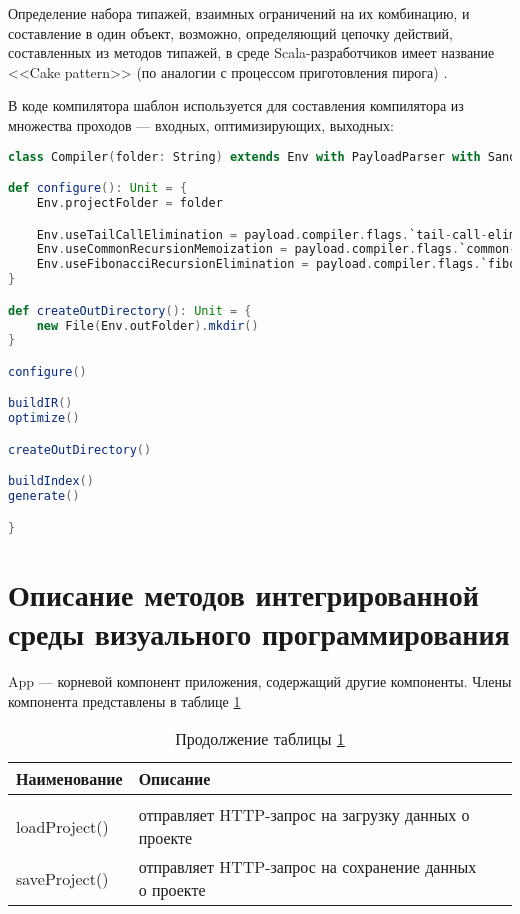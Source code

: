 Определение набора типажей, взаимных ограничений на их комбинацию,
и составление в один объект, возможно, определяющий цепочку действий,
составленных из методов типажей, в среде Scala-разработчиков имеет название
<<Cake pattern>> (по аналогии с процессом приготовления пирога) \cite{cakepattern}.

В коде компилятора шаблон используется для составления компилятора из
множества проходов --- входных, оптимизирующих, выходных:

\begin{lstlisting}[language=Scala]
class Compiler(folder: String) extends Env with PayloadParser with Sandbox with IRBuilder with Optimizer with CodeGenerator with IndexBuilder {

def configure(): Unit = {
    Env.projectFolder = folder

    Env.useTailCallElimination = payload.compiler.flags.`tail-call-elimination`
    Env.useCommonRecursionMemoization = payload.compiler.flags.`common-recursion-memoization`
    Env.useFibonacciRecursionElimination = payload.compiler.flags.`fibonacci-elimination`
}

def createOutDirectory(): Unit = {
    new File(Env.outFolder).mkdir()
}

configure()

buildIR()
optimize()

createOutDirectory()

buildIndex()
generate()

}
\end{lstlisting}

\section{Описание методов интегрированной среды визуального программирования}\label{sec:ch3/sect3}

App --- корневой компонент приложения, содержащий другие компоненты. Члены компонента представлены в таблице \ref{tab:class1}

\begin{longtable} {| p{8.3cm} | p{8.35cm}l |}
	\caption{Члены компонента App}
	\label{tab:class1}\\
	\hline
	\centering Наименование &  \centering Описание & \\
	\hline
	\endfirsthead
	\caption*{Продолжение таблицы \ref{tab:class1}}\\
	\hline
	\endhead
	\hline
	\endfoot
	loadProject() & отправляет HTTP-запрос на загрузку данных о проекте & \\
	\hline
	saveProject() & отправляет HTTP-запрос на сохранение данных о проекте & \\
\end{longtable}

